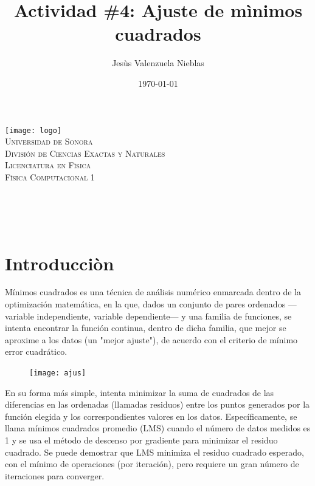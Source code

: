 \documentclass[12pt]{article}
\title{Actividad \#4: Ajuste de mìnimos cuadrados }
\author{\Large Jesùs Valenzuela Nieblas\\}
\date{\today}
\makeatletter
\let\thetitle\@title
\let\theauthor\@author
\let\thedate\@date
\makeatother
\begin{document}

\begin{titlepage}
	\centering
    \vspace*{.5cm}
     \texttt{[image: logo]}\\	%
    \textsc{\Large Universidad de Sonora}\\[1.0 cm]	%
	\textsc{\Large División de Ciencias Exactas y Naturales}\\[.50 cm]
  	\textsc{\Large Licenciatura en Fìsica}\\[.5 cm]
  \textsc{\large Fìsica Computacional 1}\\[1.5 cm]				%
	
	{ \huge \bfseries \thetitle}\\

    \vspace*{3 cm}
	\begin{minipage}{\textwidth}
    \centering
    \theauthor
	\end{minipage}\\[3 cm]
	{\large \thedate}\\[2 cm]
 
	\vfill
	
\end{titlepage}


\section{Introducciòn}
Mínimos cuadrados es una técnica de análisis numérico enmarcada dentro de la optimización matemática, en la que, dados un conjunto de pares ordenados —variable independiente, variable dependiente— y una familia de funciones, se intenta encontrar la función continua, dentro de dicha familia, que mejor se aproxime a los datos (un "mejor ajuste"), de acuerdo con el criterio de mínimo error cuadrático.
\begin{figure}[H]
\centering
\texttt{[image: ajus]}
\end{figure}

En su forma más simple, intenta minimizar la suma de cuadrados de las diferencias en las ordenadas (llamadas residuos) entre los puntos generados por la función elegida y los correspondientes valores en los datos. Específicamente, se llama mínimos cuadrados promedio (LMS) cuando el número de datos medidos es 1 y se usa el método de descenso por gradiente para minimizar el residuo cuadrado. Se puede demostrar que LMS minimiza el residuo cuadrado esperado, con el mínimo de operaciones (por iteración), pero requiere un gran número de iteraciones para converger.
\end{document}
